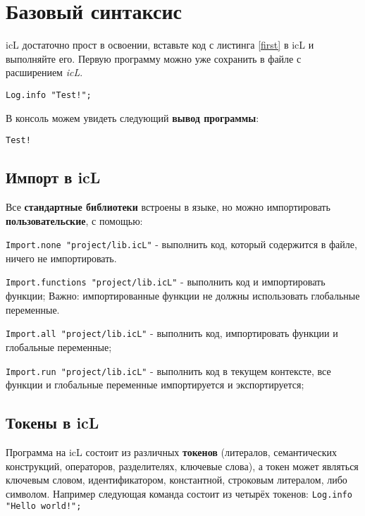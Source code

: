 

\section{Базовый синтаксис}

icL достаточно прост в освоении, вставьте код с листинга \ref{first} в icL и выполняйте его. Первую программу можно уже сохранить в файле с расширением \textit{icL}.

\begin{lstlisting}[caption=Первая программа, label=first]
Log.info "Test!";
\end{lstlisting}

В консоль можем увидеть следующий \textbf{вывод программы}:

\begin{lstlisting}[numbers=none]
Test!
\end{lstlisting}

\subsection{Импорт в icL}

Все \textbf{стандартные библиотеки} встроены в языке, но можно импортировать \textbf{пользовательские}, с помощью:

\begin{icItems}
\item
	\lstinline|Import.none "project/lib.icL"| - выполнить код, который содержится в файле, ничего не импортировать.
\item
	\lstinline|Import.functions "project/lib.icL"| - выполнить код и импортировать функции; {\color{red}Важно:} импортированные функции не должны использовать глобальные переменные.
\item
	\lstinline|Import.all "project/lib.icL"| -  выполнить код, импортировать функции и глобальные переменные;
\item
	\lstinline|Import.run "project/lib.icL"| - выполнить код в текущем контексте, все функции и глобальные переменные импортируется и экспортируется;
\end{icItems}

\subsection{Токены в icL}

Программа на icL состоит из различных \textbf{токенов} (литералов, семантических конструкций, операторов, разделителях, ключевые слова), а токен может являться ключевым словом, идентификатором, константной, строковым литералом, либо символом. Например следующая команда состоит из четырёх токенов: \lstinline|Log.info "Hello world!";|

